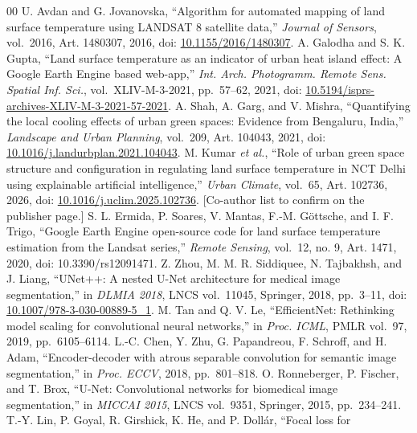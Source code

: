 \documentclass[conference]{IEEEtran}
\begin{document}
\begin{thebibliography}{00}
 U. Avdan and G. Jovanovska, ``Algorithm for automated mapping of land
surface temperature using LANDSAT 8 satellite data,'' \emph{Journal of
Sensors}, vol.~2016, Art. 1480307, 2016, doi:
\href{https://doi.org/10.1155/2016/1480307}{10.1155/2016/1480307}.
 A. Galodha and S. K. Gupta, ``Land surface temperature as an indicator
of urban heat island effect: A Google Earth Engine based web-app,''
\emph{Int. Arch. Photogramm. Remote Sens. Spatial Inf. Sci.},
vol.~XLIV-M-3-2021, pp.~57--62, 2021, doi:
\href{https://isprs-archives.copernicus.org/articles/XLIV-M-3-2021/57/2021/}{10.5194/isprs-archives-XLIV-M-3-2021-57-2021}.
 A. Shah, A. Garg, and V. Mishra, ``Quantifying the local cooling effects
of urban green spaces: Evidence from Bengaluru, India,'' \emph{Landscape
and Urban Planning}, vol.~209, Art. 104043, 2021, doi:
\href{https://www.sciencedirect.com/science/article/abs/pii/S0169204621000062}{10.1016/j.landurbplan.2021.104043}.
 M. Kumar \emph{et al.}, ``Role of urban green space structure and
configuration in regulating land surface temperature in NCT Delhi using
explainable artificial intelligence,'' \emph{Urban Climate}, vol.~65,
Art. 102736, 2026, doi:
\href{https://www.sciencedirect.com/science/article/pii/S2212095525004523}{10.1016/j.uclim.2025.102736}.
{[}Co-author list to confirm on the publisher page.{]}
 S. L. Ermida, P. Soares, V. Mantas, F.-M. Göttsche, and I. F. Trigo,
``Google Earth Engine open-source code for land surface temperature
estimation from the Landsat series,'' \emph{Remote Sensing}, vol.~12,
no. 9, Art. 1471, 2020, doi: 10.3390/rs12091471.
 Z. Zhou, M. M. R. Siddiquee, N. Tajbakhsh, and J. Liang, ``UNet++: A
nested U-Net architecture for medical image segmentation,'' in
\emph{DLMIA 2018}, LNCS vol.~11045, Springer, 2018, pp.~3--11, doi:
\href{https://arxiv.org/abs/1807.10165}{10.1007/978-3-030-00889-5\_1}.
 M. Tan and Q. V. Le, ``EfficientNet: Rethinking model scaling for
convolutional neural networks,'' in \emph{Proc. ICML}, PMLR vol.~97,
2019, pp.~6105--6114.
 L.-C. Chen, Y. Zhu, G. Papandreou, F. Schroff, and H. Adam,
``Encoder-decoder with atrous separable convolution for semantic image
segmentation,'' in \emph{Proc. ECCV}, 2018, pp.~801--818.
 O. Ronneberger, P. Fischer, and T. Brox, ``U-Net: Convolutional networks
for biomedical image segmentation,'' in \emph{MICCAI 2015}, LNCS
vol.~9351, Springer, 2015, pp.~234--241.
 T.-Y. Lin, P. Goyal, R. Girshick, K. He, and P. Dollár, ``Focal loss for

\end{thebibliography}
\end{document}
